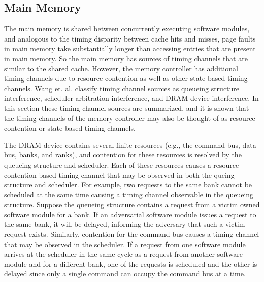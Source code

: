 \subsection{Main Memory}
The main memory is shared between concurrently executing software modules, and 
analogous to the timing disparity between cache hits and misses, page faults in 
main memory take substantially longer than accessing entries that are present 
in main memory. So the main memory has sources of timing channels that are 
similar to the shared cache. However, the memory controller has additional 
timing channels due to resource contention as well as other state based timing 
channels. Wang et. al. classify timing channel sources as queueing structure 
interference, scheduler arbitration interference, and DRAM device interference.  
In this section these timing channel sources are summarized, and it is shown 
that the timing channels of the memory controller may also be thought of as 
resource contention or state based timing channels.

The DRAM device contains several finite resources (e.g., the command bus, data
bus, banks, and ranks), and contention for these resources is resolved by the 
queueing structure and scheduler. Each of these resources causes a resource 
contention based timing channel that may be observed in both the queing 
structure and scheduler. For example, two requests to the same bank cannot
be scheduled at the same time causing a timing channel observable in the 
queueing structure. Suppose the queueing structure contains a request from a 
victim owned software module for a bank. If an adversarial software module 
issues a request to the same bank, it will be delayed, informing the adversary 
that such a victim request exists.  Similarly, contention for the command bus 
causes a timing channel that may be observed in the scheduler. If a request 
from one software module arrives at the scheduler in the same cycle as a 
request from another software module and for a different bank, one of the 
requests is scheduled and the other is delayed since only a single command can 
occupy the command bus at a time.


